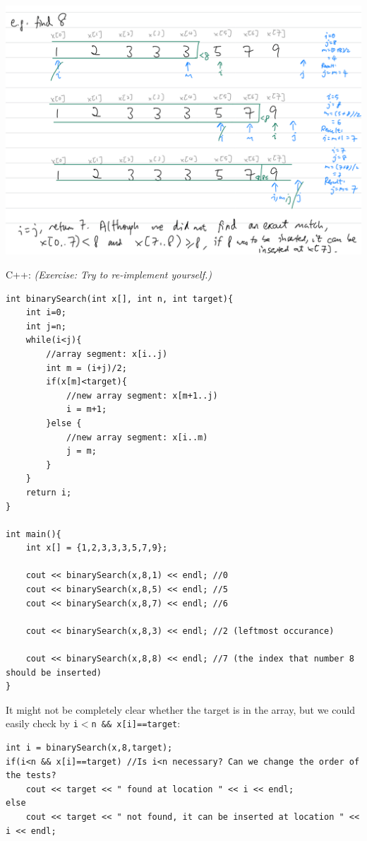 \includegraphics[width=14cm]{images/ch7-binarysearch8.png}

\pagebreak

C++: \textit{(Exercise:  Try to re-implement yourself.)}

\begin{lstlisting}
int binarySearch(int x[], int n, int target){
    int i=0;
    int j=n;
    while(i<j){
        //array segment: x[i..j)
        int m = (i+j)/2;
        if(x[m]<target){
            //new array segment: x[m+1..j)
            i = m+1;
        }else {
            //new array segment: x[i..m)
            j = m;
        }
    }
    return i;
}

int main(){
    int x[] = {1,2,3,3,3,5,7,9};

    cout << binarySearch(x,8,1) << endl; //0
    cout << binarySearch(x,8,5) << endl; //5
    cout << binarySearch(x,8,7) << endl; //6

    cout << binarySearch(x,8,3) << endl; //2 (leftmost occurance)

    cout << binarySearch(x,8,8) << endl; //7 (the index that number 8 should be inserted)
}
\end{lstlisting}

It might not be completely clear whether the target is in the array, but we could easily check by \texttt{i$<$n \&\& x[i]==target}:

\begin{lstlisting}
int i = binarySearch(x,8,target);
if(i<n && x[i]==target) //Is i<n necessary? Can we change the order of the tests?
    cout << target << " found at location " << i << endl;
else 
    cout << target << " not found, it can be inserted at location " << i << endl;
\end{lstlisting}

